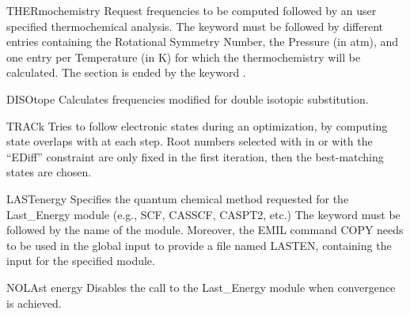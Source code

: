 \begin{keywordlist}
\item[THERmochemistry]
Request frequencies to be computed followed by an user specified thermochemical analysis.
The keyword must be followed by different entries containing the Rotational Symmetry Number,
the Pressure (in atm), and one entry per Temperature (in K)
for which the thermochemistry will be calculated.
The section is ended by the keyword .
\item[DISOtope]
Calculates frequencies modified for double isotopic substitution.
\item[TRACk]
Tries to follow electronic states during an optimization, by computing state overlaps with 
at each step. Root numbers selected with  in  or with the ``EDiff'' constraint
are only fixed in the first iteration, then the best-matching states are chosen.
\item[LASTenergy]
Specifies the quantum chemical method requested for the Last\_Energy module (e.g., SCF, CASSCF, CASPT2, etc.)
The keyword must be followed by the name of the module. Moreover, the EMIL command COPY needs to be used
in the global input to provide a file named LASTEN, containing the input for the specified module.
\item[NOLAst energy]
Disables the call to the Last\_Energy module when convergence is achieved.

\end{keywordlist}


